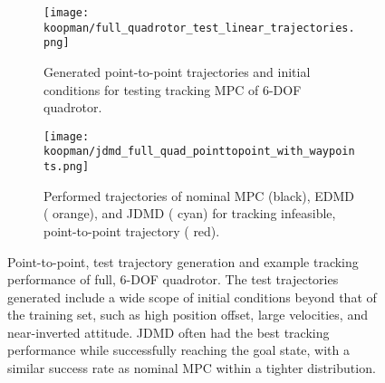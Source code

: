 \documentclass[../root.tex]{subfiles}
\begin{document}
\begin{figure}[t] \centering
	\begin{subfigure}[t]{0.49\textwidth}
		\centering
		\texttt{[image: koopman/full\_quadrotor\_test\_linear\_trajectories.png]}
		\caption{Generated point-to-point trajectories and initial conditions for testing
		tracking MPC of 6-DOF quadrotor.}
		\label{fig:rex_full_quadrotor_initial_conditions}
	\end{subfigure}
	\hfill
	\begin{subfigure}[t]{0.49\textwidth}
		\raggedright
		\texttt{[image: koopman/jdmd\_full\_quad\_pointtopoint\_with\_waypoints.png]}
		\caption{Performed trajectories of nominal MPC (black), EDMD (\color{orange}
		orange\color{black}), and JDMD (\color{cyan} cyan\color{black}) for tracking infeasible,
		point-to-point trajectory (\color{red} red\color{black}).}
		\label{fig:jdmd_full_quad_pointtopoint_with_waypoints}
	\end{subfigure}
	\caption{Point-to-point, test trajectory generation and example tracking performance of full, 6-DOF quadrotor. The test                trajectories generated include a wide scope of initial conditions beyond that of the training set, such as high                 position offset, large velocities, and near-inverted attitude. JDMD often had the best tracking performance while               successfully reaching the goal state, with a similar success rate as nominal MPC within a tighter distribution. 
	}
\end{figure}


\end{document}

